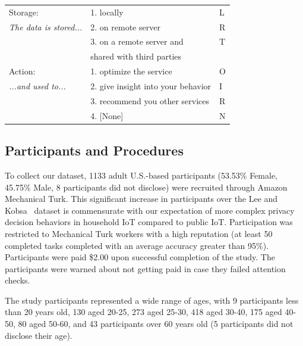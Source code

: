 \begin{table}
\begin{tabular} {l|l|l}
		Storage:  & 1. locally	& L\\
		\emph{The data is stored...} & 2. on remote server & R						\\
		& 3. on a remote server and & T\\
		& shared with third parties &\\\hline
		Action: & 1. optimize the service & O \\
		\emph{...and used to... } & 2. give insight into your behavior& I \\
		& 3. recommend you other services & R\\
		& 4. [None] & N\\ \hline
	\end{tabular}
\end{table}

\subsection{Participants and Procedures}
To collect our dataset, 1133 adult U.S.-based participants (53.53\% Female, 45.75\% Male, 8 participants did not disclose) were recruited through Amazon Mechanical Turk. This significant increase in participants over the Lee and Kobsa~\cite{lee2016understanding} dataset is commensurate with our expectation of more complex privacy decision behaviors in household IoT compared to public IoT. Participation was restricted to Mechanical Turk workers with a high reputation (at least 50 completed tasks completed with an average accuracy greater than 95\%). Participants were paid \$2.00 upon successful completion of the study. The participants were warned about not getting paid in case they failed attention checks.

The study participants represented a wide range of ages, with 9 participants less than 20 years old, 130 aged 20-25, 273 aged 25-30, 418 aged 30-40, 175 aged 40-50, 80 aged 50-60, and 43 participants over 60 years old (5 participants did not disclose their age).

